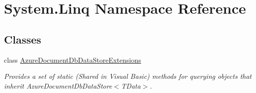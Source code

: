 \hypertarget{namespaceSystem_1_1Linq}{}\section{System.\+Linq Namespace Reference}
\label{namespaceSystem_1_1Linq}
\subsection*{Classes}
\begin{DoxyCompactItemize}
\item 
class \hyperlink{classSystem_1_1Linq_1_1AzureDocumentDbDataStoreExtensions}{Azure\+Document\+Db\+Data\+Store\+Extensions}
\begin{DoxyCompactList}\small\item\em Provides a set of static (Shared in Visual Basic) methods for querying objects that inherit Azure\+Document\+Db\+Data\+Store$<$\+T\+Data$>$. \end{DoxyCompactList}\end{DoxyCompactItemize}
